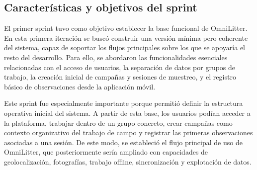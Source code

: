 \subsection{Características y objetivos del sprint}

El primer sprint tuvo como objetivo establecer la base funcional de OmniLitter.
En esta primera iteración se buscó construir una versión mínima pero coherente
del sistema, capaz de soportar los flujos principales sobre los que se apoyaría
el resto del desarrollo. Para ello, se abordaron las funcionalidades esenciales
relacionadas con el acceso de usuarios, la separación de datos por grupos de
trabajo, la creación inicial de campañas y sesiones de muestreo, y el registro
básico de observaciones desde la aplicación móvil.

Este sprint fue especialmente importante porque permitió definir la estructura
operativa inicial del sistema. A partir de esta base, los usuarios podían
acceder a la plataforma, trabajar dentro de un grupo concreto, crear campañas
como contexto organizativo del trabajo de campo y registrar las primeras
observaciones asociadas a una sesión. De este modo, se estableció el flujo
principal de uso de OmniLitter, que posteriormente sería ampliado con
capacidades de geolocalización, fotografías, trabajo offline, sincronización y
explotación de datos.

